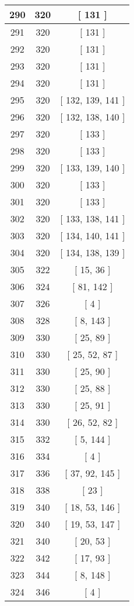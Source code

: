 \begin{center}
\begin{longtable}[H]{|| c c c ||}
\hline
290 & 320 & [ 131 ] \\ 
\hline
291 & 320 & [ 131 ] \\ 
\hline
292 & 320 & [ 131 ] \\ 
\hline
293 & 320 & [ 131 ] \\ 
\hline
294 & 320 & [ 131 ] \\ 
\hline
295 & 320 & [ 132, 139, 141 ] \\ 
\hline
296 & 320 & [ 132, 138, 140 ] \\ 
\hline
297 & 320 & [ 133 ] \\ 
\hline
298 & 320 & [ 133 ] \\ 
\hline
299 & 320 & [ 133, 139, 140 ] \\ 
\hline
300 & 320 & [ 133 ] \\ 
\hline
301 & 320 & [ 133 ] \\ 
\hline
302 & 320 & [ 133, 138, 141 ] \\ 
\hline
303 & 320 & [ 134, 140, 141 ] \\ 
\hline
304 & 320 & [ 134, 138, 139 ] \\ 
\hline
305 & 322 & [ 15, 36 ] \\ 
\hline
306 & 324 & [ 81, 142 ] \\ 
\hline
307 & 326 & [ 4 ] \\ 
\hline
308 & 328 & [ 8, 143 ] \\ 
\hline
309 & 330 & [ 25, 89 ] \\ 
\hline
310 & 330 & [ 25, 52, 87 ] \\ 
\hline
311 & 330 & [ 25, 90 ] \\ 
\hline
312 & 330 & [ 25, 88 ] \\ 
\hline
313 & 330 & [ 25, 91 ] \\ 
\hline
314 & 330 & [ 26, 52, 82 ] \\ 
\hline
315 & 332 & [ 5, 144 ] \\ 
\hline
316 & 334 & [ 4 ] \\ 
\hline
317 & 336 & [ 37, 92, 145 ] \\ 
\hline
318 & 338 & [ 23 ] \\ 
\hline
319 & 340 & [ 18, 53, 146 ] \\ 
\hline
320 & 340 & [ 19, 53, 147 ] \\ 
\hline
321 & 340 & [ 20, 53 ] \\ 
\hline
322 & 342 & [ 17, 93 ] \\ 
\hline
323 & 344 & [ 8, 148 ] \\ 
\hline
324 & 346 & [ 4 ] \\ 

\end{longtable}
\end{center}
